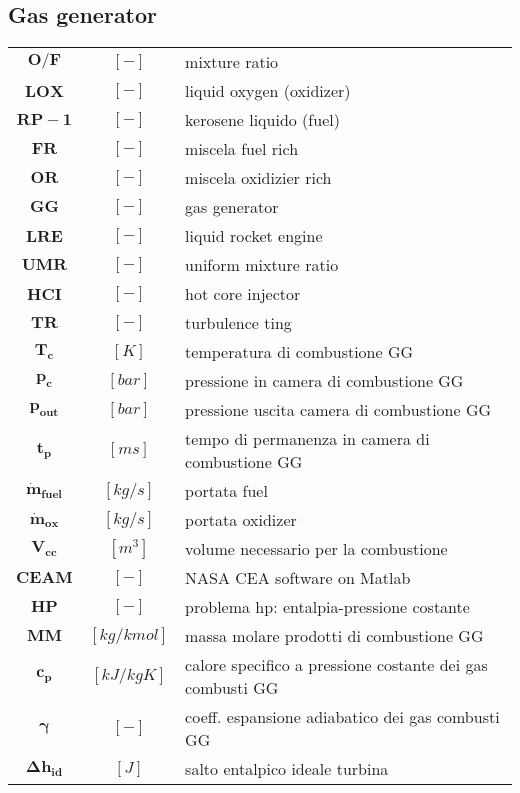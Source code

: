 \begin{multicols}{2}
	\subsection{Gas generator}
	\begin{tabularx}{\linewidth}{cc>{\raggedright\arraybackslash}X}
		$\bm{O/F}$ & $[-]$ & mixture ratio \\
		$\bm{LOX}$ & $[-]$ & liquid oxygen (oxidizer)\\
		$\bm{RP-1}$ & $[-]$ & kerosene liquido (fuel) \\
		$\bm{FR}$ & $[-]$ & miscela fuel rich\\
		$\bm{OR}$ & $[-]$ & miscela oxidizier rich\\
		$\bm{GG}$ & $[-]$ & gas generator\\
		$\bm{LRE}$ & $[-]$ & liquid rocket engine\\
		$\bm{UMR}$ & $[-]$ & uniform mixture ratio\\
		$\bm{HCI}$ & $[-]$ & hot core injector\\
		$\bm{TR}$ & $[-]$ & turbulence ting\\
		$\bm{T_c}$ & $[K]$ & temperatura di combustione GG\\
		$\bm{p_c}$ & $[bar]$ & pressione in camera di combustione GG\\
		$\bm{p_{out}}$ & $[bar]$ & pressione uscita camera di combustione GG\\
		$\bm{t_p}$ & $[ms]$ & tempo di permanenza in camera di combustione GG\\
		$\bm{\dot{m}_{fuel}}$ & $[kg/s]$ & portata fuel\\
		$\bm{\dot{m}_{ox}}$ & $[kg/s]$ & portata oxidizer\\
		$\bm{V_{cc}}$ & $[m^3]$ & volume necessario per la combustione\\
		$\bm{CEAM}$ & $[-]$ & NASA CEA software on Matlab\\
		$\bm{HP}$ & $[-]$ & problema hp: entalpia-pressione costante\\
		$\bm{MM}$ & $[kg/kmol]$ & massa molare prodotti di combustione GG\\
		$\bm{c_p}$ & $[kJ/kgK]$ & calore specifico a pressione costante dei gas combusti GG\\
		$\bm{\gamma}$ & $[-]$ & coeff. espansione adiabatico dei gas combusti GG\\
		$\bm{\Delta h_{id}}$ & $[J]$ & salto entalpico ideale turbina
	\end{tabularx}
	

\end{multicols}
